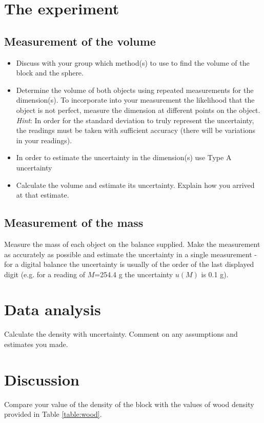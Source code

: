 \section{The experiment}
\subsection{Measurement of the volume}
\begin{itemize}
\item
Discuss with your group which method(s) to use to find the volume of the block and the sphere.
\item
Determine the volume of both objects using repeated measurements for the dimension(s).  To incorporate into your measurement the likelihood that the object is not perfect, measure the dimension at different points on the object. \emph{Hint}: In order for the standard deviation to truly represent the uncertainty, the readings must be taken with sufficient accuracy (there will be variations in your readings).
\item
In order to estimate the uncertainty in the dimension(s) use Type A uncertainty 
\item
Calculate the volume and estimate its uncertainty. Explain how you arrived at that estimate.
\end{itemize}


\subsection{Measurement of the mass}
Measure the mass of each object on the balance supplied.  Make the measurement as accurately as possible and estimate the uncertainty in a single measurement - for a digital balance the uncertainty is usually of the order of the last displayed digit (e.g. for a reading of $M$=254.4 g the uncertainty $u(M)$ is 0.1 g). 

\section{Data analysis}
Calculate the density with uncertainty. Comment on any assumptions and estimates you made.

\section{Discussion}
Compare your value of the density of the block with the values of wood density provided in Table \ref{table:wood}. 

